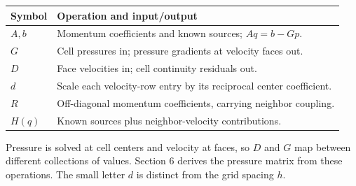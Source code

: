 \begin{center}\begin{tabular}{lp{.77\linewidth}}\toprule
Symbol & Operation and input/output\\\midrule
$A,b$ & Momentum coefficients and known sources; $Aq=b-Gp$.\\
$G$ & Cell pressures in; pressure gradients at velocity faces out.\\
$D$ & Face velocities in; cell continuity residuals out.\\
$d$ & Scale each velocity-row entry by its reciprocal center coefficient.\\
$R$ & Off-diagonal momentum coefficients, carrying neighbor coupling.\\
$H(q)$ & Known sources plus neighbor-velocity contributions.\\\bottomrule
\end{tabular}\end{center}
Pressure is solved at cell centers and velocity at faces, so $D$ and $G$
map between different collections of values. Section 6 derives the pressure
matrix from these operations. The small letter $d$ is distinct from the grid
spacing $h$.
